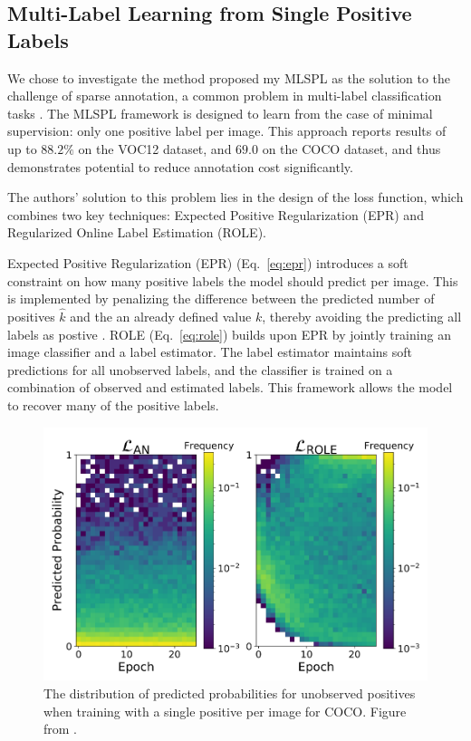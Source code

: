 \documentclass[lettersize,journal]{IEEEtran}
\begin{document}
\subsection{Multi-Label Learning from Single Positive Labels}
We chose to investigate the method proposed my MLSPL as the solution to the challenge of sparse annotation, a common problem in multi-label classification tasks \cite{mlsp}. The MLSPL framework is designed to learn from the case of minimal supervision: only one positive label per image. This approach reports results of up to $88.2\%$ on the VOC12 dataset, and $69.0$ on the COCO dataset, and thus demonstrates potential to reduce annotation cost significantly.

The authors' solution to this problem lies in the design of the loss function, which combines two key techniques: Expected Positive Regularization (EPR) and Regularized Online Label Estimation (ROLE).

Expected Positive Regularization (EPR) (Eq.~\ref{eq:epr}) introduces a soft constraint on how many positive labels the model should predict per image. This is implemented by penalizing the difference between the predicted number of positives $\hat{k}$ and the an already defined value $k$, thereby avoiding the predicting all labels as postive \cite{mlsp}. ROLE (Eq.~\ref{eq:role}) builds upon EPR by jointly training an image classifier and a label estimator. The label estimator maintains soft predictions for all unobserved labels, and the classifier is trained on a combination of observed and estimated labels. This framework allows the model to recover many of the positive labels.

\begin{figure}[t]
    \centering
    \includegraphics[width=.8\linewidth]{images/mlsp_fig2.png}
    \caption{The distribution of predicted probabilities for unobserved positives when training with a single positive per image for COCO. Figure from \cite{mlsp}.}
    \label{fig:mlsp_fig2}
\end{figure}
\end{document}
